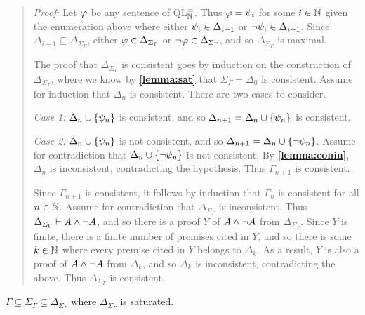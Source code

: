 \begin{quote} 
  \textit{Proof:} 
  Let $\varphi$ be any sentence of QL$^=_{\mathbb{N}}$.
  Thus $\varphi=\psi_i$ for some $i\in\mathbb{N}$ given the enumeration above where either $\psi_i\in\Delta_{i+1}$ or $\neg\psi_i\in\Delta_{i+1}$.
  Since $\Delta_{i+1}\subseteq\Delta_{\Sigma_\Gamma}$, either $\varphi\in\Delta_{\Sigma_\Gamma}$ or $\neg\varphi\in\Delta_{\Sigma_\Gamma}$, and so $\Delta_{\Sigma_\Gamma}$ is maximal.

  The proof that $\Delta_{\Sigma_\Gamma}$ is consistent goes by induction on the construction of $\Delta_{\Sigma_\Gamma}$, where we know by \textbf{\ref{lemma:sat}} that $\Sigma_\Gamma=\Delta_0$ is consistent. 
  Assume for induction that $\Delta_n$ is consistent. 
  There are two cases to consider.

  \textit{Case 1:} $\Delta_n\cup\lbrace\psi_n\rbrace$ is consistent, and so $\Delta_{n+1}=\Delta_n\cup\lbrace\psi_n\rbrace$ is consistent. 

  \textit{Case 2:} $\Delta_n\cup\lbrace\psi_n\rbrace$ is not consistent, and so $\Delta_{n+1}=\Delta_n\cup\lbrace\neg\psi_n\rbrace$. 
  Assume for contradiction that $\Delta_n\cup\lbrace\neg\psi_n\rbrace$ is not consistent. 
  By \textbf{\ref{lemma:conin}}, $\Delta_n$ is inconsistent, contradicting the hypothesis. 
  Thus $\Gamma_{n+1}$ is consistent. 

  Since $\Gamma_{n+1}$ is consistent, it follows by induction that $\Gamma_n$ is consistent for all $n\in\mathbb{N}$.
  Assume for contradiction that $\Delta_{\Sigma_\Gamma}$ is inconsistent.
  Thus $\Delta_{\Sigma_\Gamma}\vdash A\wedge\neg A$, and so there is a proof $Y$ of $A\wedge\neg A$ from $\Delta_{\Sigma_\Gamma}$. 
  Since $Y$ is finite, there is a finite number of premises cited in $Y$, and so there is some $k\in\mathbb{N}$ where every premise cited in $Y$ belongs to $\Delta_k$.
  As a result, $Y$ is also a proof of $A\wedge\neg A$ from $\Delta_k$, and so $\Delta_k$ is inconsistent, contradicting the above. 
  Thus $\Delta_{\Sigma_\Gamma}$ is consistent. 
\end{quote}




\begin{Lthm} \label{lemma:include}
  $\Gamma\subseteq\Sigma_\Gamma\subseteq\Delta_{\Sigma_\Gamma}$ where $\Delta_{\Sigma_\Gamma}$ is saturated.
\end{Lthm}
 
